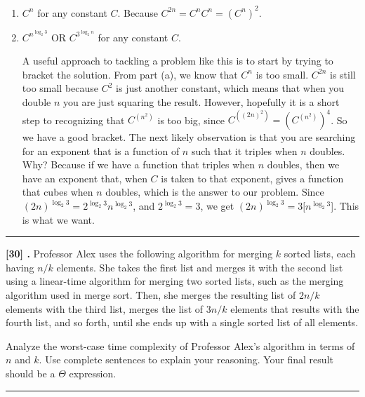 \documentclass[11pt,twoside]{article}
\newcounter{problem}
\newcommand{\problem}[1]{%
	\refstepcounter{problem}\noindent\textbf{[#1] \arabic{problem}.}}
\newcommand{\solution}{\bigskip\hrule\bigskip}
\newcommand{\problembreak}{\bigskip\hrule\bigskip}
\begin{document}
	\begin{enumerate}
		
		\item
		$C^n$ for any constant $C$.
		Because $C^{2n} = C^nC^n = (C^n)^2$.
		
		\item
		$C^{n^{\log_2 3}}$ OR $C^{3^{\log_2 n}}$ for any constant $C$.
		
		A useful approach to tackling a problem like this is to start by trying to bracket the solution.
		From part (a), we know that $C^n$ is too small.
		$C^{2n}$ is still too small because $C^2$ is just another constant, which means that when you double $n$ you are just squaring the result.
		However, hopefully it is a short step to recognizing that $C^{(n^2)}$ is too big, since $C^{((2n)^2)} = (C^{(n^2)})^4$.
		So we have a good bracket. The next likely observation is that you are searching for an exponent that is a function of $n$ such that it triples
		when $n$ doubles. Why?
		Because if we have a function that triples when $n$ doubles, then we have an exponent that, when $C$ is taken to that exponent, gives a function that cubes when $n$ doubles, which is the answer to
		our problem. Since $(2n)^{\log_2 3} = 2^{\log_2 3} n^{\log_2 3}$, and $2^{\log_2 3} = 3$, we get $(2n)^{\log_2 3} = 3[n^{\log_2 3}$]. This is what we want.
		
	\end{enumerate}
	
	
	
	\problembreak
	
	\problem{30}
	Professor Alex uses the following algorithm for merging $k$ sorted lists, each having $n/k$ elements.
	She takes the first list and merges it with the second list using a linear-time algorithm for merging two sorted lists, such as the merging algorithm used in merge sort.
	Then, she merges the resulting list of $2n/k$ elements with the third list, merges the list of $3n/k$ elements that results with the fourth list, and so forth, until she ends up with a single sorted list of all elements.
	{\bfseries
		
		
		
		Analyze the worst-case time complexity of Professor Alex’s algorithm in terms of $n$ and $k$.
		Use complete sentences to explain your reasoning.
		Your final result should be a $\Theta$ expression.
		
		
	}
	
	\solution
	
	
\end{document}
